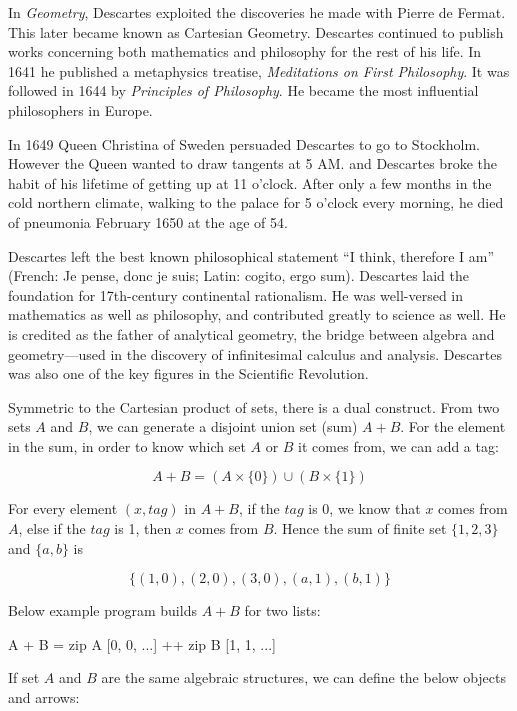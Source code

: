 \documentclass[b5paper]{article}
\begin{document}
In {\em Geometry}, Descartes exploited the discoveries he made with Pierre de Fermat. This later became known as Cartesian Geometry. Descartes continued to publish works concerning both mathematics and philosophy for the rest of his life. In 1641 he published a metaphysics treatise, {\em Meditations on First Philosophy}. It was followed in 1644 by {\em Principles of Philosophy}. He became the most influential philosophers in Europe.

In 1649 Queen Christina of Sweden persuaded Descartes to go to Stockholm. However the Queen wanted to draw tangents at 5 AM. and Descartes broke the habit of his lifetime of getting up at 11 o'clock. After only a few months in the cold northern climate, walking to the palace for 5 o'clock every morning, he died of pneumonia February 1650 at the age of 54.

Descartes left the best known philosophical statement ``I think, therefore I am'' (French: Je pense, donc je suis; Latin: cogito, ergo sum). Descartes laid the foundation for 17th-century continental rationalism. He was well-versed in mathematics as well as philosophy, and contributed greatly to science as well. He is credited as the father of analytical geometry, the bridge between algebra and geometry—used in the discovery of infinitesimal calculus and analysis. Descartes was also one of the key figures in the Scientific Revolution.

\vspace{5mm}

Symmetric to the Cartesian product of sets, there is a dual construct. From two sets $A$ and $B$, we can generate a disjoint union set (sum) $A + B$. For the element in the sum, in order to know which set $A$ or $B$ it comes from, we can add a tag:

\[
A + B = (A \times \{0\}) \cup (B \times \{1\})
\]

For every element $(x, tag)$ in $A + B$, if the $tag$ is 0, we know that $x$ comes from $A$, else if the $tag$ is 1, then $x$ comes from $B$. Hence the sum of finite set $\{1, 2, 3\}$ and $\{a, b\}$ is

\[
\{(1, 0), (2, 0), (3, 0), (a, 1), (b, 1)\}
\]

Below example program builds $A + B$ for two lists:

\begin{Haskell}[frame=single]
A + B = zip A [0, 0, ...] ++ zip B [1, 1, ...]
\end{Haskell}

If set $A$ and $B$ are the same algebraic structures, we can define the below objects and arrows:
\end{document}
